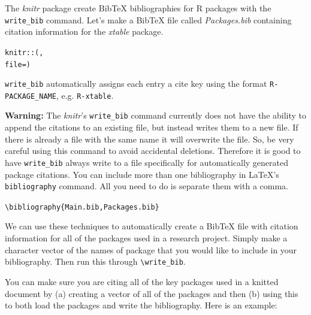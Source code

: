 The {\emph{knitr}} package create BibTeX bibliographies for R packages with the \texttt{write\_bib} command. Let's make a BibTeX file called \emph{Packages.bib} containing citation information for the \emph{xtable} package.

\begin{knitrout}
\color{fgcolor}\begin{kframe}
\begin{alltt}
knitr::(,
                 file = )
\end{alltt}
\end{kframe}
\end{knitrout}


\noindent \verb|write_bib| automatically assigns each entry a cite key using the format \verb|R-PACKAGE_NAME|, e.g. \verb|R-xtable|.

\textbf{Warning:} The \emph{knitr}'s \verb|write_bib| command currently does not have the ability to append the citations to an existing file, but instead writes them to a new file. If there is already a file with the same name it will overwrite the file. So, be very careful using this command to avoid accidental deletions. Therefore it is good to have \verb|write_bib| always write to a file specifically for automatically generated package citations. You can include more than one bibliography in LaTeX's \texttt{bibliography} command. All you need to do is separate them with a comma.

\begin{knitrout}
\color{fgcolor}\begin{kframe}
\begin{alltt}
\textbackslash{}bibliography\{Main.bib,Packages.bib\}
\end{alltt}
\end{kframe}
\end{knitrout}


We can use these techniques to automatically create a BibTeX file with citation information for all of the packages used in a research project. Simply make a character vector of the names of package that you would like to include in your bibliography. Then run this through \verb|\write_bib|. 

You can make sure you are citing all of the key packages used in a knitted document by (a) creating a vector of all of the packages and then (b) using this to both load the packages and write the bibliography. Here is an example:

